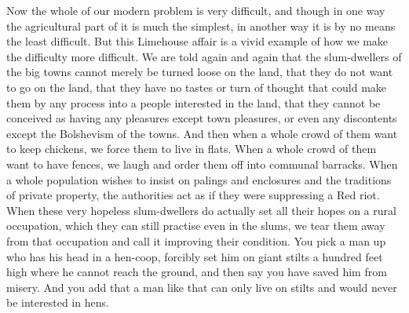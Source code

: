 \documentclass{book}
\begin{document}
Now the whole of our modern problem is very difficult, and though in one way the agricultural part of it is much the simplest, in another way it is by no means the least difficult. But this Limehouse affair is a vivid example of how we make the difficulty more difficult. We are told again and again that the slum-dwellers of the big towns cannot merely be turned loose on the land, that they do not want to go on the land, that they have no tastes or turn of thought that could make them by any process into a people interested in the land, that they cannot be conceived as having any pleasures except town pleasures, or even any discontents except the Bolshevism of the towns. And then when a whole crowd of them want to keep chickens, we force them to live in flats. When a whole crowd of them want to have fences, we laugh and order them off into communal barracks. When a whole population wishes to insist on palings and enclosures and the traditions of private property, the authorities act as if they were suppressing a Red riot. When these very hopeless slum-dwellers do actually set all their hopes on a rural occupation, which they can still practise even in the slums, we tear them away from that occupation and call it improving their condition. You pick a man up who has his head in a hen-coop, forcibly set him on giant stilts a hundred feet high where he cannot reach the ground, and then say you have saved him from misery. And you add that a man like that can only live on stilts and would never be interested in hens.
\end{document}
